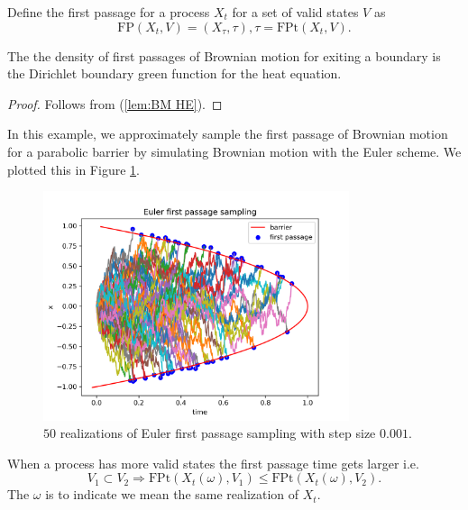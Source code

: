 \documentclass[a4paper,12pt]{article}
\begin{document}
\begin{definition} \label{def:first passage}
    Define the first passage for a process $X_{t}$ for a set of valid states
    $V$ as
    \begin{equation}
        \text{FP}(X_{t},V)=(X_{\tau},\tau), \tau = \text{FPt}(X_{t},V)
        .
    \end{equation}
\end{definition}

\begin{theorem}
    The the density of first passages of Brownian motion for  exiting a  boundary is  the
    Dirichlet boundary green function for the heat equation.
\end{theorem}

\begin{proof}
    Follows from (\ref{lem:BM HE}).
\end{proof}

\begin{example}
    In this example, we approximately sample the first passage of Brownian motion
    for a parabolic barrier by simulating Brownian motion with the Euler scheme. We plotted
    this in Figure \ref{fig:Euler first passage para}.

    \begin{figure}[h!]
        \centering
        \includegraphics[width=0.8\textwidth]{plots/Euler first passage para.png}
        \caption{ $50$ realizations of Euler first passage sampling with step size $0.001$.}
        \label{fig:Euler first passage para}
    \end{figure}
\end{example}

\begin{lemma} \label{lem: FP order}
    When a process has more valid states the first passage time gets larger i.e.
    \begin{equation}
        V_{1} \subset V_{2} \Rightarrow
        \text{FPt}(X_{t}(\omega),V_{1}) \le  \text{FPt}(X_{t}(\omega),V_{2}) .
    \end{equation}
    The $\omega$ is to indicate we mean the same realization of $X_{t}$.
\end{lemma}
\end{document}
